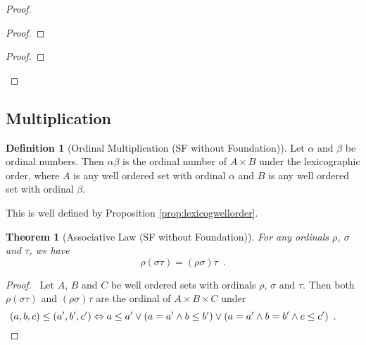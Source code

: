 \documentclass{book}
\let\qed\relax
\newtheorem{thm}[ax]{Theorem}
\theoremstyle{definition}
\newtheorem{df}[ax]{Definition}
\begin{document}
\begin{proof}
\pf
{}
\begin{proof}
\end{proof}
\begin{proof}
\end{proof}
\qed
\end{proof}

\subsection{Multiplication}

\begin{df}[Ordinal Multiplication (SF without Foundation)]
Let $\alpha$ and $\beta$ be ordinal numbers. Then $\alpha \beta$ is the ordinal number of $A \times B$ under the lexicographic order, where $A$ is any well ordered set with ordinal $\alpha$ and $B$ is any well ordered set with ordinal $\beta$.
\end{df}

This is well defined by Proposition \ref{prop:lexicogwellorder}.

\begin{thm}[Associative Law (SF without Foundation)]
For any ordinals $\rho$, $\sigma$ and $\tau$, we have
\[ \rho (\sigma \tau) = (\rho \sigma) \tau \enspace . \]
\end{thm}

\begin{proof}
\pf\ Let $A$, $B$ and $C$ be well ordered sets with ordinals $\rho$, $\sigma$ and $\tau$. Then both $\rho (\sigma \tau)$ and $(\rho \sigma) \tau$ are the ordinal of $A \times B \times C$ under
\[ (a,b,c) \leq (a',b',c') \Leftrightarrow a \leq a' \vee (a = a' \wedge b \leq b') \vee (a = a' \wedge b = b' \wedge c \leq c') \enspace . \qquad \qed \]
\end{proof}
\end{document}
